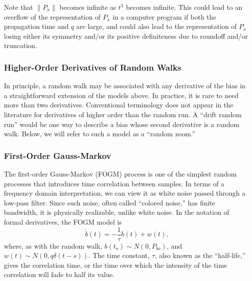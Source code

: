 Note that $\|P_x\|$ becomes infinite as $t^3$ becomes infinite.  This could lead to an overflow of the representation of $P_x$ in a computer program if both the propagation time and $q$ are large, and could also lead to the representation of $P_x$ losing either its symmetry and/or its positive definiteness due to roundoff and/or truncation.

\subsubsection{Higher-Order Derivatives of Random Walks}

In principle, a random walk may be associated with any derivative of the bias in a straightforward extension of the models above.  In practice, it is rare to need more than two derivatives.  Conventional terminology does not appear in the literature for derivatives of higher order than the random run.  A ``drift random run'' would be one way to describe a bias whose second derivative is a random walk.  Below, we will refer to such a model as a ``random zoom.''

\subsubsection{First-Order Gauss-Markov}

The first-order Gauss-Markov (FOGM) process is one of the simplest random processes that introduces time correlation between samples.  In terms of a frequency domain interpretation, we can view it as white noise passed through a low-pass filter.  Since such noise, often called ``colored noise,'' has finite bandwidth, it is physically realizable, unlike white noise.  In the notation of formal derivatives, the FOGM model is
\begin{equation}
	\dot{b}(t) = -\frac{1}{\tau} b(t) + w(t),
\end{equation}
where, as with the random walk, $b(t_o) \sim N(0, P_{bo})$, and $w(t) \sim N(0, q\delta(t-s))$.  The time constant, $\tau$, also known as the ``half-life,'' gives the correlation time, or the time over which the intensity of the time correlation will fade to half its value.

